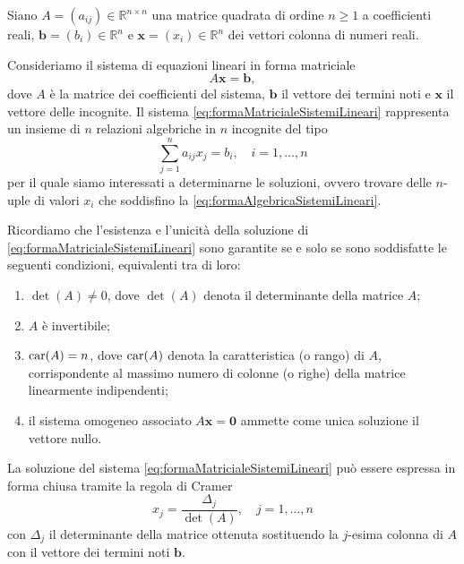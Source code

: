 Siano $A=(a_{ij})\in\mathbb{R}^{n\times n}$ una matrice quadrata di ordine $n\ge1$ a coefficienti reali, $\mathbf{b}=(b_{i})\in\mathbb{R}^{n}$
e $\mathbf{x}=(x_{i})\in\mathbb{R}^{n}$ dei vettori colonna di numeri reali.

Consideriamo il sistema di equazioni lineari in forma matriciale
\begin{equation}
    \label{eq:formaMatricialeSistemiLineari}
    A\mathbf{x}=\mathbf{b},
\end{equation}
dove $A$ \`e la matrice dei coefficienti del sistema, $\mathbf{b}$ il vettore dei termini noti e $\mathbf{x}$ il vettore delle incognite.\newline
Il sistema \eqref{eq:formaMatricialeSistemiLineari} rappresenta un insieme di $n$ relazioni algebriche in
$n$ incognite del tipo
\begin{equation}
    \label{eq:formaAlgebricaSistemiLineari}
    \sum_{j=1}^{n}a_{ij}x_{j}=b_{i},\quad i = 1,\dots,n
\end{equation}
per il quale siamo interessati a determinarne le soluzioni, ovvero trovare delle $n$-uple di valori $x_{i}$ che
soddisfino la \eqref{eq:formaAlgebricaSistemiLineari}.

Ricordiamo che l'esistenza e l'unicit\`a della soluzione di \eqref{eq:formaMatricialeSistemiLineari} sono garantite se e solo se sono soddisfatte
le seguenti condizioni, equivalenti tra di loro:
\begin{enumerate}
    \item $\det(A)\ne 0$, dove $\det(A)$ denota il determinante della matrice $A$;
    \item $A$ \`e invertibile;
    \item $\operatorname{car}(A)= n$, dove $\operatorname{car}(A)$ denota la caratteristica (o rango) di $A$, corrispondente al massimo numero di colonne (o righe) della matrice linearmente indipendenti;
    \item il sistema omogeneo associato $A\mathbf{x}=\mathbf{0}$ ammette come unica soluzione il vettore nullo.
\end{enumerate}

La soluzione del sistema \eqref{eq:formaMatricialeSistemiLineari} pu\`o essere espressa in forma chiusa tramite la regola di Cramer
\begin{equation}
    x_{j} = \frac{\Delta_{j}}{\det(A)},\quad j = 1,\dots,n
\end{equation}
con $\Delta_{j}$ il determinante della matrice ottenuta sostituendo la $j$-esima colonna di $A$ con il vettore dei termini noti $\mathbf{b}$.

